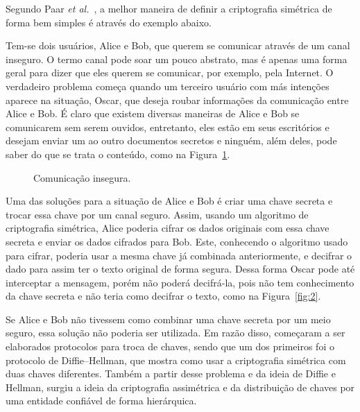 \documentclass{article}
\begin{document}
Segundo Paar \textit{et al.}~\cite{Paar:book:2009}, a melhor maneira de definir
a criptografia simétrica de forma bem simples é através do exemplo abaixo.

Tem-se dois usuários, Alice e Bob, que querem se comunicar através de um canal
inseguro. O termo canal pode soar um pouco abstrato, mas é apenas uma forma
geral para dizer que eles querem se comunicar, por exemplo, pela
Internet. O verdadeiro problema começa quando um terceiro usuário com más
intenções aparece na situação, Oscar, que deseja roubar informações da
comunicação entre Alice e Bob. É claro que existem diversas maneiras de Alice
e Bob se comunicarem sem serem ouvidos, entretanto, eles estão em seus
escritórios e desejam enviar um ao outro documentos secretos e ninguém, além
deles, pode saber do que se trata o conteúdo, como na Figura~\ref{fig:1}.

\begin{figure}[!ht]
  \centering
  \caption{Comunicação insegura.}\label{fig:1}
\end{figure}

Uma das soluções para a situação de Alice e Bob é criar uma chave secreta
e trocar essa chave por um canal seguro. Assim, usando um algoritmo de
criptografia simétrica, Alice poderia cifrar os dados originais com essa chave
secreta e enviar os dados cifrados para Bob. Este, conhecendo o algoritmo usado
para cifrar, poderia usar a mesma chave já combinada anteriormente, e decifrar
o dado para assim ter o texto original de forma segura. Dessa forma Oscar pode
até interceptar a mensagem, porém não poderá decifrá-la, pois não tem
conhecimento da chave secreta e não teria como decifrar o texto, como na
Figura~\ref{fig:2}.

Se Alice e Bob não tivessem como combinar uma chave secreta por um meio seguro,
essa solução não poderia ser utilizada. Em razão disso, começaram a ser
elaborados protocolos para troca de chaves, sendo que um dos primeiros foi
o protocolo de Diffie--Hellman, que mostra como usar a criptografia simétrica
com duas chaves diferentes. Também a partir desse problema e da ideia de
Diffie e Hellman, surgiu a ideia da criptografia assimétrica e da distribuição
de chaves por uma entidade confiável de forma hierárquica.
\end{document}
